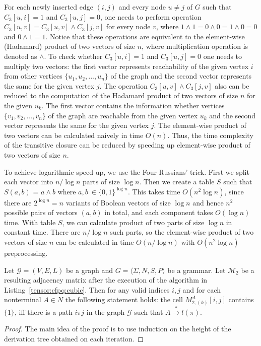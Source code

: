 For each newly inserted edge $(i, j)$ and every node $u \neq j$ of $G$ such that $C_3[u, i] = 1$ and $C_3[u, j]=0$, one needs to perform operation $C_3[u,v] = C_3[u, v] \wedge C_3[j, v]$ for every node $v$, where $1 \wedge 1 = 0 \wedge 0 = 1 \wedge 0 = 0$ and $0 \wedge 1 = 1$.
Notice that these operations are equivalent to the element-wise (Hadamard) product of two vectors of size $n$, where multiplication operation is denoted as $\wedge$. To check whether $C_3[u, i] = 1$ and $C_3[u, j]=0$ one needs to multiply two vectors: the first vector represents reachability of the given vertex $i$ from other vertices $\{u_1, u_2, ..., u_n\}$ of the graph and the second vector represents the same for the given vertex $j$. The operation $C_3[u, v] \wedge C_3[j, v]$ also can be reduced to the computation of the Hadamard product of two vectors of size $n$ for the given $u_k$. The first vector contains the information whether vertices  $\{v_1, v_2, ..., v_n\}$ of the graph are reachable from the given vertex $u_k$ and the second vector represents the same for the given vertex $j$. The element-wise product of two vectors can be calculated naively in time $O(n)$. Thus, the time complexity of the transitive closure can be reduced by speeding up element-wise product of two vectors of size $n$.


To achieve logarithmic speed-up, we use the Four Russians' trick.
First we split each vector into $n/\log n$ parts of size $\log n$.
Then we create a table $S$ such that $S(a, b)$ = $a \wedge b$ where $a, b \ \in {\{0,1\}}^{\log n}$.
This takes time $O(n^2 \log n)$, since there are $2^{\log n} = n$ variants of Boolean vectors of size $\log n$ and hence $n^2$ possible pairs of vectors $(a, b)$ in total, and each component takes $O(\log n)$ time.
With table $S$, we can calculate product of two parts of size $\log n$ in constant time.
There are $n/\log n$ such parts, so the element-wise product of two vectors of size $n$ can be calculated in time $O(n/\log n)$ with $O(n^2 \log n)$ preprocessing.

\begin{theorem}
    Let $\mathcal{G} = (V,E,L)$ be a graph and $G = \langle\Sigma, N, S, P\rangle$ be a grammar.
    Let $\mathcal{M}_{2}$ be a resulting adjacency matrix after the execution of the algorithm in Listing~\ref{tensor:cfpq:cubic}. Then for any valid indices $i, j$ and for each nonterminal $A \in N$ the following statement holds: the cell $M_{2,(k)}^A[i,j]$ contains $\{1\}$, iff there is a path $i\pi j$ in the graph $\mathcal{G}$ such that $ A \xrightarrow{*} l(\pi)$.
\end{theorem}{}
\begin{proof}
    The main idea of the proof is to use induction on the height of the derivation tree obtained on each iteration.
\end{proof}{}


